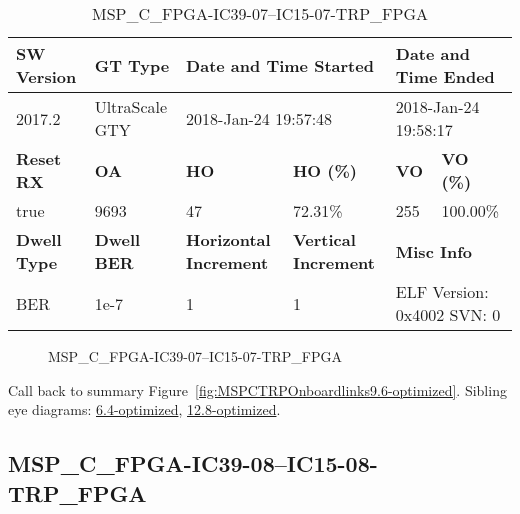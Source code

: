\begin{table}[h]
\centering
\caption{MSP\_C\_FPGA-IC39-07--IC15-07-TRP\_FPGA}
\label{tab:MSPCFPGAIC3907IC1507TRPFPGA9.6-optimized}
\begin{tabular}{@{}|l|l|l|l|l|l|@{}}
\toprule
\textbf{SW Version}                & \textbf{GT Type}   & \multicolumn{2}{l|}{\textbf{Date and Time Started}}            & \multicolumn{2}{l|}{\textbf{Date and Time Ended}}        \\ \midrule
2017.2                       & UltraScale GTY          & \multicolumn{2}{l|}{2018-Jan-24 19:57:48}                   & \multicolumn{2}{l|}{2018-Jan-24 19:58:17}               \\ \midrule
\textbf{Reset RX}                  & \textbf{OA} & \textbf{HO}   & \textbf{HO (\%)} & \textbf{VO} & \textbf{VO (\%)} \\ \midrule
true & 9693        & 47          & 72.31\%        & 255        & 100.00\%       \\ \midrule
\textbf{Dwell Type}                & \textbf{Dwell BER} & \textbf{Horizontal Increment} & \textbf{Vertical Increment}    & \multicolumn{2}{l|}{\textbf{Misc Info}}                  \\ \midrule
BER                            & 1e-7        & 1        & 1           & \multicolumn{2}{l|}{ELF Version: 0x4002 SVN: 0}                         \\ \bottomrule
\end{tabular}
\end{table}

\begin{figure}[h]
\caption{MSP\_C\_FPGA-IC39-07--IC15-07-TRP\_FPGA} \label{fig:MSPCFPGAIC3907IC1507TRPFPGA9.6-optimized}
\end{figure}

Call back to summary Figure~\ref{fig:MSPCTRPOnboardlinks9.6-optimized}.
Sibling eye diagrams: \hyperref[sec:MSPCFPGAIC3907IC1507TRPFPGA6.4-optimized]{6.4-optimized}, \hyperref[sec:MSPCFPGAIC3907IC1507TRPFPGA12.8-optimized]{12.8-optimized}.

\clearpage
\newpage


\subsection{MSP\_C\_FPGA-IC39-08--IC15-08-TRP\_FPGA}\label{sec:MSPCFPGAIC3908IC1508TRPFPGA9.6-optimized}


